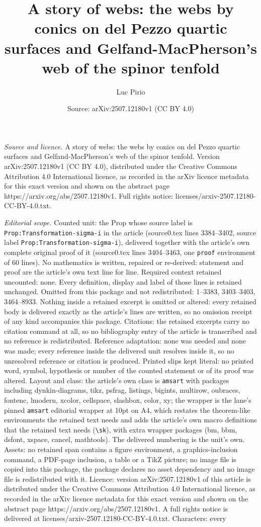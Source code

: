 \documentclass[10pt,a4paper]{amsart}
\title[A story of webs: the webs by conics on del Pezzo quartic sur]{A story of webs: the webs by conics on del Pezzo quartic surfaces and Gelfand-MacPherson's web of the spinor tenfold}
\author{Luc Pirio}
\date{Source: arXiv:2507.12180v1 (CC BY 4.0)}
\begin{document}
\maketitle

\noindent\emph{Source and licence.} A story of webs: the webs by conics on del Pezzo quartic surfaces and Gelfand-MacPherson's web of the spinor tenfold. Version arXiv:2507.12180v1 (CC BY 4.0), distributed under the Creative Commons Attribution 4.0 International licence, as recorded in the arXiv licence metadata for this exact version and shown on the abstract page https://arxiv.org/abs/2507.12180v1. Full rights notice: licenses/arxiv-2507.12180-CC-BY-4.0.txt.\par\smallskip

\noindent\textit{Editorial scope.} Counted unit: the Prop whose source label is \texttt{Prop:Transformation-sigma-i} in the article (source0.tex lines 3384--3402, source label \texttt{Prop:Transformation-sigma-i}), delivered together with the article's own complete original proof of it (source0.tex lines 3404--3463, one \texttt{proof} environment of 60 lines). No mathematics is written, repaired or re-derived: statement and proof are the article's own text line for line. Required context retained uncounted: none. Every definition, display and label of those lines is retained unchanged. Omitted from this package and not redistributed: 1--3383, 3403--3403, 3464--8933. Nothing inside a retained excerpt is omitted or altered: every retained body is delivered exactly as the article's lines are written, so no omission receipt of any kind accompanies this package. Citations: the retained excerpts carry no citation command at all, so no bibliography entry of the article is transcribed and no reference is redistributed. Reference adaptation: none was needed and none was made; every reference inside the delivered unit resolves inside it, so no unresolved reference or citation is produced. Printed slips kept literal: no printed word, symbol, hypothesis or number of the counted statement or of its proof was altered. Layout and class: the article's own class is \texttt{amsart} with packages including dynkin-diagrams, tikz, psfrag, listings, bigints, multirow, oubraces, fontenc, lmodern, xcolor, cellspace, slashbox, color, xy; the wrapper is the lane's pinned \texttt{amsart} editorial wrapper at 10pt on A4, which restates the theorem-like environments the retained text needs and adds the article's own macro definitions that the retained text needs (\texttt{\textbackslash sk}), with extra wrapper packages (bm, bbm, dsfont, xspace, cancel, mathtools). The delivered numbering is the unit's own. Assets: no retained span contains a figure environment, a graphics-inclusion command, a PDF-page inclusion, a table or a TikZ picture; no image file is copied into this package, the package declares no asset dependency and no image file is redistributed with it. Licence: version arXiv:2507.12180v1 of this article is distributed under the Creative Commons Attribution 4.0 International licence, as recorded in the arXiv licence metadata for this exact version and shown on the abstract page https://arxiv.org/abs/2507.12180v1. A full rights notice is delivered at licenses/arxiv-2507.12180-CC-BY-4.0.txt. Characters: every 
\end{document}
